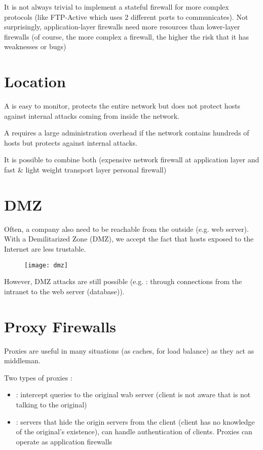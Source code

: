 It is not always trivial to implement a stateful firewall for more complex protocols (like FTP-Active which uses 2 different ports to communicates). Not surprisingly, application-layer firewalls need more resources than lower-layer firewalls (of course, the more complex a firewall, the higher the risk that it has weaknesses or bugs)

\section{Location}

A  is easy to monitor, protects the entire network but does not protect hosts against internal attacks coming from inside the network.

A  requires a large administration overhead if the network contains hundreds of hosts but protects against internal attacks.

It is possible to combine both (expensive network firewall at application layer and fast \& light weight transport layer personal firewall)

\section{DMZ}

Often, a company also need to be reachable from the outside (e.g. web server). With a Demilitarized Zone (DMZ), we accept the fact that hosts exposed to the Internet are less trustable.

\begin{figure}[H]
    \centering
    \texttt{[image: dmz]}
\end{figure}

However, DMZ attacks are still possible (e.g. : through connections from the intranet to the web server (database)).

\section{Proxy Firewalls}

Proxies are useful in many situations (as caches, for load balance) as they act as middleman.

Two types of proxies :
\begin{itemize}
    \item {} : intercept queries to the original wab server (client is not aware that is not talking to the original)
    \item {} : servers that hide the origin servers from the client (client has no knowledge of the original's existence), can handle authentication of clients. Proxies can operate as application firewalls
\end{itemize}

